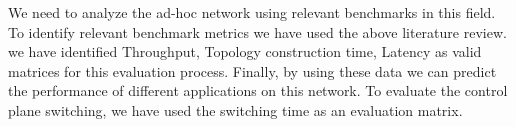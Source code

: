 We need to analyze the ad-hoc network using relevant benchmarks in this field. To identify relevant benchmark metrics we have used the above literature review. we have identified Throughput, Topology construction time, Latency as valid matrices for this evaluation process. Finally, by using these data we can predict the performance of different applications on this network. To evaluate the control plane switching, we have used the switching time as an evaluation matrix.

\vspace{12pt}
\clearpage







